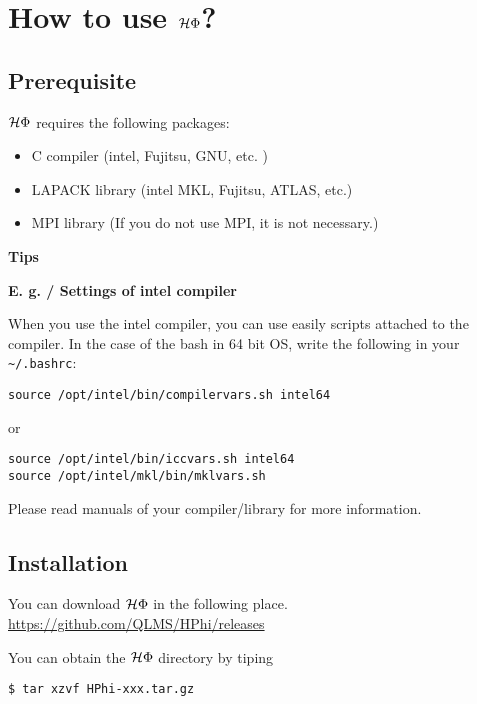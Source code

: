 \chapter{How to use $\mathcal{H} \Phi$?}
\label{Ch:HowTo}

\section{Prerequisite}

$\mathcal{H} \Phi$ requires the following packages:
\begin{itemize}
\item C compiler (intel, Fujitsu, GNU, etc. )
\item LAPACK library (intel MKL, Fujitsu, ATLAS, etc.)
\item MPI library (If you do not use MPI, it is not necessary.)
\end{itemize}

\begin{screen}
\Large 
{\bf Tips}
\normalsize

{\bf E. g. / Settings of intel compiler}

When you use the intel compiler, you can use easily scripts attached to the compiler.
In the case of the bash in 64 bit OS, write the following in your \verb|~/.bashrc|:
\begin{verbatim}
source /opt/intel/bin/compilervars.sh intel64
\end{verbatim}
or
\begin{verbatim}
source /opt/intel/bin/iccvars.sh intel64
source /opt/intel/mkl/bin/mklvars.sh
\end{verbatim}

Please read manuals of your compiler/library for more information.

\end{screen}

\section{Installation}

You can download $\mathcal{H} \Phi$ in the following place.\\
\url{https://github.com/QLMS/HPhi/releases}

You can obtain the $\mathcal{H} \Phi$ directory by tiping
\begin{verbatim}
$ tar xzvf HPhi-xxx.tar.gz
\end{verbatim}

